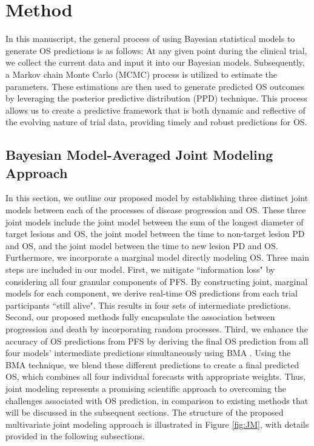 \section{Method}
\label{sec:method}
In this manuscript, the general process of using Bayesian statistical models to generate \ac{OS} predictions is as follows: At any given point during the clinical trial, we collect the current data and input it into our Bayesian models. Subsequently, a Markov chain Monte Carlo (MCMC) process is utilized to estimate the parameters. These estimations are then used to generate predicted \ac{OS} outcomes by leveraging the posterior predictive distribution (PPD) technique. This process allows us to create a predictive framework that is both dynamic and reflective of the evolving nature of trial data, providing timely and robust predictions for OS.


\subsection{Bayesian Model-Averaged Joint Modeling Approach}
\label{sec:jm}

In this section, we outline our proposed model by establishing three distinct joint models between each of the processes of disease progression and OS. These three joint models include the joint model between the sum of the longest diameter of target lesions and OS, the joint model between the time to non-target lesion \ac{PD} and OS, and the joint model between the time to new lesion \ac{PD} and OS. Furthermore, we incorporate a marginal model directly modeling OS. Three main steps are included in our model. First, we mitigate ``information loss" by considering all four granular components of PFS. By constructing joint, marginal models for each component, we derive real-time \ac{OS} predictions from each trial participants ``still alive". This results in four sets of intermediate predictions. Second, our proposed methods fully encapsulate the association between progression and death by incorporating random processes. Third, we enhance the accuracy of \ac{OS} predictions from \ac{PFS} by deriving the final \ac{OS} prediction from all four models' intermediate predictions simultaneously using \ac{BMA} \citep{hoeting1999bayesian}. Using the \ac{BMA} technique, we blend these different predictions to create a final predicted OS, which combines all four individual forecasts with appropriate weights. Thus, joint modeling represents a promising scientific approach to overcoming the challenges associated with \ac{OS} prediction, in comparison to existing methods that will be discussed in the subsequent sections. The structure of the proposed multivariate joint modeling approach is illustrated in Figure \ref{fig:JM}, with details provided in the following subsections.

